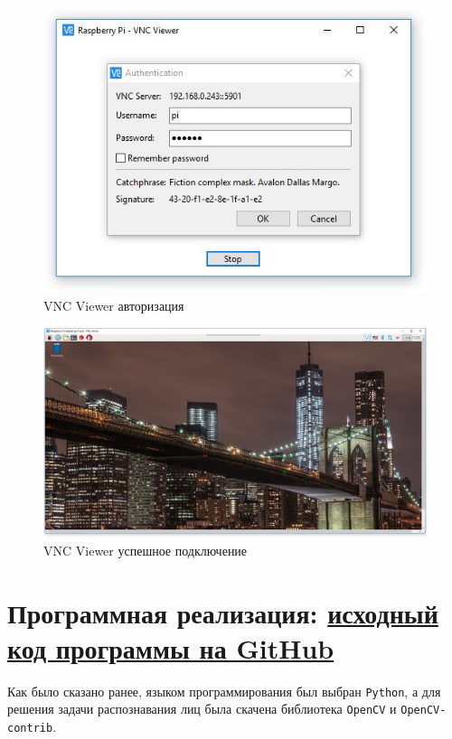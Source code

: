 \documentclass[a4paper,11pt]{article}
\begin{document}
\begin{figure}[h!]
  \begin{center}
    \includegraphics[scale=0.6]{images/image2.png}
  \caption{VNC Viewer авторизация}
  \end{center}
\end{figure}
\begin{figure}[h!]
  \begin{center}
    \includegraphics[scale=0.4]{images/image1.png}
  \caption{VNC Viewer успешное подключение}
  \end{center}
\end{figure}

\section{Программная реализация: \href{https://github.com/Yang-Pi/My-HomeCam-Security}{исходный код программы на GitHub}}
\noindent Как было сказано ранее, языком программирования был выбран \verb|Python|, а для решения задачи распознавания лиц была скачена библиотека \verb|OpenCV| и \verb|OpenCV-contrib|. \\
\end{document}
